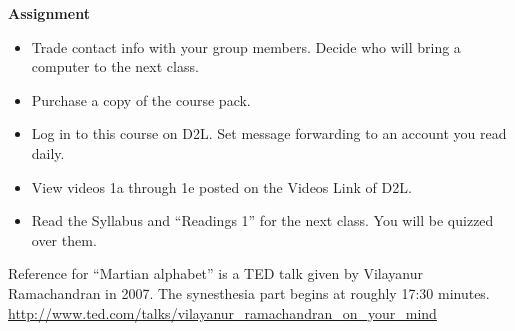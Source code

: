 {\bf Assignment}
\begin{itemize}
\item  Trade contact info with your group members.  Decide who will
  bring a computer to the next class.
\item   Purchase a copy of the course pack.
\item   Log in to this course on D2L. Set message forwarding to an
  account you read daily.
\item View videos 1a through 1e posted on the Videos Link of D2L.
\item Read the Syllabus and ``Readings 1'' %
  for  the next class. You will be quizzed over them. 
\end{itemize}


Reference for ``Martian alphabet'' is a TED talk given by Vilayanur
Ramachandran in 2007. The synesthesia part begins at roughly 17:30 minutes.
\url{http://www.ted.com/talks/vilayanur_ramachandran_on_your_mind}